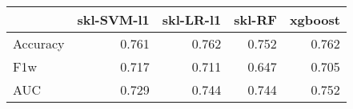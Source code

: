 \begin{tabular}{lrrrr}
\toprule
{} &  skl-SVM-l1 &  skl-LR-l1 &  skl-RF &  xgboost \\
\midrule
Accuracy &       0.761 &      0.762 &   0.752 &    0.762 \\
F1w      &       0.717 &      0.711 &   0.647 &    0.705 \\
AUC      &       0.729 &      0.744 &   0.744 &    0.752 \\
\bottomrule
\end{tabular}
